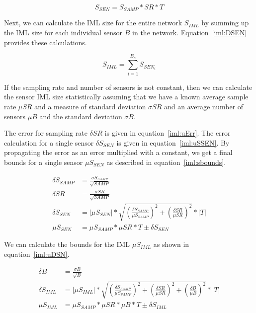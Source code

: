 \begin{equation}\label{iml:SSEN}
	S_{SEN} = S_{SAMP} * SR * T
\end{equation}

Next, we can calculate the IML size for the entire network $S_{IML}$ by summing up the IML size for each individual sensor $B$ in the network. Equation~\ref{iml:DSEN} provides these calculations.

\begin{equation}\label{iml:DSEN}
	S_{IML} = \sum_{i=1}^{B_{n}} S_{SEN_{i}}
\end{equation}

If the sampling rate and number of sensors is not constant, then we can calculate the sensor IML size statistically assuming that we have a known average sample rate $\mu SR$ and a measure of standard deviation $\sigma SR$ and an average number of sensors $\mu B$ and the standard deviation $\sigma B$.

The error for sampling rate $\delta SR$ is given in equation~\ref{iml:uErr}. The error calculation for a single sensor $\delta S_{SEN}$ is given in equation~\ref{iml:uSSEN}. By propagating the error as an error multiplied with a constant, we get a final bounds for a single sensor $\mu S_{SEN}$ as described in equation~\ref{iml:sbounds}.

\begin{align}
	\delta S_{SAMP} &= \frac{\sigma S_{SAMP}}{\sqrt{SAMP}} \label{} \\
	\delta SR &= \frac{\sigma SR}{\sqrt{SAMP}} \label{iml:uErr} \\
	\delta S_{SEN} &= |\mu S_{SEN}| * \sqrt{(\frac{\delta S_{SAMP}}{\mu S_{SAMP}})^2 + (\frac{\delta SR}{\mu SR})^2} * |T| \label{iml:uSSEN}  \\
	\mu S_{SEN} &= \mu S_{SAMP} * \mu SR * T \pm \delta S_{SEN} \label{iml:sbounds}
\end{align}

We can calculate the bounds for the IML $\mu S_{IML}$ as shown in equation~\ref{iml:uDSN}.

\begin{align}
	\delta B &= \frac{\sigma B}{\sqrt{B}} \\
	\delta S_{IML} &= |\mu S_{IML}| * \sqrt{(\frac{\delta S_{SAMP}}{\mu S_{SAMP}})^2 + (\frac{\delta SR}{\mu SR})^2 + (\frac{\delta B}{\mu B})^2} * |T| \label{}  \\
	\mu S_{IML} &= \mu S_{SAMP} * \mu SR * \mu B * T \pm \delta S_{IML} \label{iml:uDSN}
\end{align}

